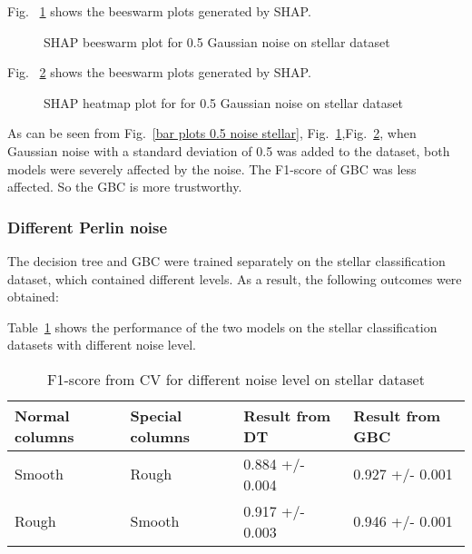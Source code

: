 \documentclass[runningheads,a4paper]{llncs}
\begin{document}
Fig. ~\ref{bee plots 0.5 noise stellar} shows the beeswarm plots generated by SHAP.
\begin{figure}[H]
	\centering
	
	\hfill
	
	
	\caption{SHAP beeswarm plot for 0.5 Gaussian noise on stellar dataset}
	\label{bee plots 0.5 noise stellar}
	
\end{figure}
Fig. ~\ref{heat plots 0.5 noise stellar} shows the beeswarm plots generated by SHAP.
\begin{figure}[H]
	\centering
	
	\hfill
	
	
	\caption{SHAP heatmap plot for for 0.5 Gaussian noise  on stellar dataset}
	\label{heat plots 0.5 noise stellar}
	
\end{figure}


As can be seen from Fig.~\ref{bar plots 0.5 noise stellar}, Fig.~\ref{bee plots 0.5 noise stellar},Fig.~\ref{heat plots 0.5 noise stellar}, when Gaussian noise with a standard deviation of 0.5 was added to the dataset, both models were severely affected by the noise. The F1-score of GBC was less affected. So the GBC is more trustworthy.
\subsubsection{Different Perlin noise}
The decision tree and GBC were trained separately on the stellar classification dataset, which contained different levels. As a result, the following outcomes were obtained:

Table~\ref{result from different stellar} shows the performance of the two models on the stellar classification datasets with different noise level.
\begin{table}[H]
	\centering
	\caption{F1-score from CV for different noise level on stellar dataset}
	\label{result from different stellar}
	\begin{tabular}{|l|l|l|l|}
		\hline
		Normal columns &Special columns & Result from DT  &Result from GBC\\
		\hline
		Smooth & Rough&0.884 +/- 0.004 &  0.927 +/- 0.001\\
		Rough & Smooth& 0.917 +/- 0.003 & 0.946 +/- 0.001 \\
		\hline
	\end{tabular}
\end{table}
\end{document}
